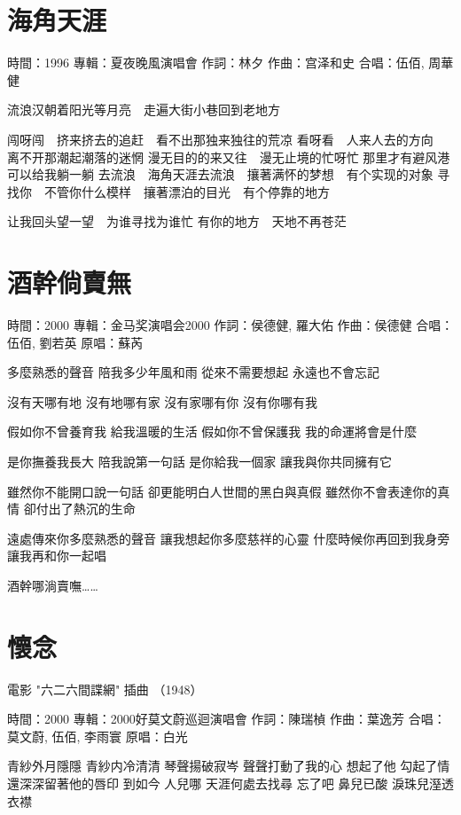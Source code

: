 \documentclass[UTF8,a4paper,oneside,twocolumn,12pt]{ctexbook}
\newcommand{\infopair}[2]{\textbullet #1：#2}
\newcommand{\zc}[1][伍佰]{\infopair{作詞}{#1}}
\newcommand{\zq}[1][伍佰]{\infopair{作曲}{#1}}
\newcommand{\zj}[1]{\infopair{專輯}{#1}}
\newcommand{\yc}[1]{\infopair{原唱}{#1}}
\newcommand{\sj}[1]{\infopair{時間}{#1}}
\newenvironment{info}{\begin{flushleft}\kaishu
	}
	{\end{flushleft}\normalsize\yahei\par}
\newenvironment{lyric}{
	}
{}
\begin{document}
\section{海角天涯}
\begin{info}
	\sj{1996}
	\zj{夏夜晚風演唱會}
	\zc[林夕]
	\zq[宫泽和史]
	\infopair{合唱}{伍佰, 周華健}
\end{info}
\begin{lyric}
	流浪汉朝着阳光等月亮　走遍大街小巷回到老地方

	闯呀闯　挤来挤去的追赶　看不出那独来独往的荒凉
	看呀看　人来人去的方向　离不开那潮起潮落的迷惘
	漫无目的的来又往　漫无止境的忙呀忙
	那里才有避风港　　可以给我躺一躺
	去流浪　海角天涯去流浪　攘著满怀的梦想　有个实现的对象
	寻找你　不管你什么模样　攘著漂泊的目光　有个停靠的地方

	让我回头望一望　为谁寻找为谁忙
	有你的地方　天地不再苍茫
\end{lyric}

\section{酒幹倘賣無}
\begin{info}
	\sj{2000}
	\zj{金马奖演唱会2000}
	\zc[侯德健, 羅大佑]
	\zq[侯德健]
	\infopair{合唱}{伍佰, 劉若英}
	\yc{蘇芮}
\end{info}
\begin{lyric}
	多麼熟悉的聲音
	陪我多少年風和雨
	從來不需要想起
	永遠也不會忘記

	沒有天哪有地
	沒有地哪有家
	沒有家哪有你
	沒有你哪有我

	假如你不曾養育我
	給我溫暖的生活
	假如你不曾保護我
	我的命運將會是什麼

	是你撫養我長大
	陪我說第一句話
	是你給我一個家
	讓我與你共同擁有它

	雖然你不能開口說一句話
	卻更能明白人世間的黑白與真假
	雖然你不會表達你的真情
	卻付出了熱沉的生命

	遠處傳來你多麼熟悉的聲音
	讓我想起你多麼慈祥的心靈
	什麼時候你再回到我身旁
	讓我再和你一起唱

	酒幹哪淌賣嘸……
\end{lyric}

\section{懷念}
\begin{info}
	電影 "六二六間諜網" 插曲 （1948）

	\sj{2000}
	\zj{2000好莫文蔚巡迴演唱會}
	\zc[陳瑞楨]
	\zq[葉逸芳]
	\infopair{合唱}{莫文蔚, 伍佰, 李雨寰}
	\yc{白光}
\end{info}
\begin{lyric}
	青紗外月隱隱
	青紗内冷清清
	琴聲揚破寂岑
	聲聲打動了我的心
	想起了他 勾起了情
	還深深留著他的唇印
	到如今 人兒哪
	天涯何處去找尋
	忘了吧 鼻兒已酸
	淚珠兒溼透衣襟
\end{lyric}
\end{document}
